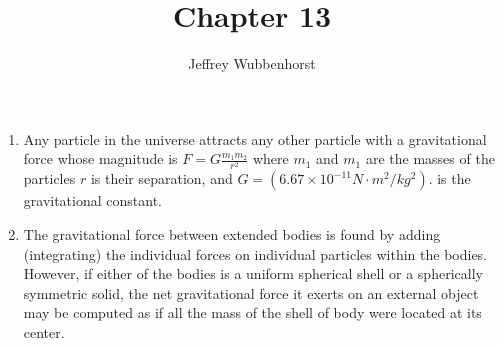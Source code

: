 \documentclass[10pt,letterpaper]{article}
\author{Jeffrey Wubbenhorst}
\title{Chapter 13}
\begin{document}
\maketitle
\begin{enumerate}
\item Any particle in the universe attracts any other particle with a gravitational force whose magnitude is $F=G\frac{m_1m_2}{r^2}$ where $m_1$ and $m_1$ are the masses of the particles $r$ is their separation, and $G=(6.67\times 10^{-11}N\cdot m^2/kg^2)$.  is the gravitational constant. 
\item The gravitational force between extended bodies is found by adding (integrating) the individual forces on individual particles within the bodies. However, if either of the bodies is a uniform spherical shell or a spherically symmetric solid, the net gravitational force it exerts on an external object may be computed as if all the mass of the shell of body were located at its center. 





\end{enumerate}
\end{document}
